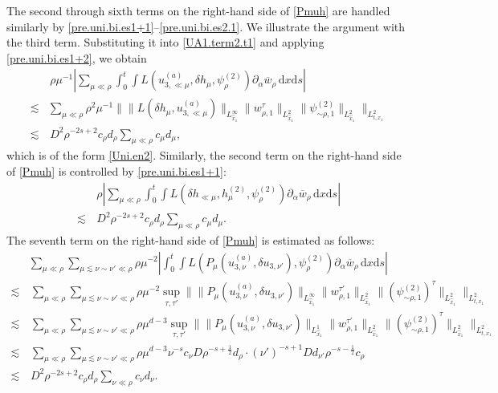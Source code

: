 \documentclass[11pt,letterpaper,reqno]{amsart}
\numberwithin{equation}{section}
\theoremstyle{definition}
\theoremstyle{remark}
\begin{document}
The second through sixth terms on the right-hand side of \eqref{Pmuh} are
handled similarly by \eqref{pre.uni.bi.es1+1}--\eqref{pre.uni.bi.es2.1}.
We illustrate the argument with the third term. Substituting it into
\eqref{UA1.term2.t1} and applying \eqref{pre.uni.bi.es1+2}, we obtain
\begin{align}
  &\,    \rho \mu^{-1} \left| \sum_{\mu \ll \rho}
\int_0^t\int
L
(u^{(a)}_{3, \ll\mu}, \delta h_{ \mu}, \psi_\rho^{(2)})
\partial_\alpha\overline{w}_\rho\,\mathrm{d} x \mathrm{d} s  
\right|  \label{Mrho.term2.1} \\
\lesssim &  \sum_{\mu\ll\rho}   
\rho^2\mu^{-1}  \big \| \|   L(  \delta h_{\mu},    u^{(a)}_{3, \ll \mu})\|_{L^\infty_{\widehat{x}_1}} \| w_{\rho,1}^{\tau}\|_{L^2_{\widehat{x}_1}} \|  \psi_{\sim\rho,1}^{(2)}\|_{L^2_{\widehat{x}_1}} \big\|_{L^2_{ t,x_1}} \nonumber\\
\lesssim &\,  D^2\rho^{-2s+2}
c_\rho d_\rho
\sum_{\mu\ll\rho}c_\mu d_\mu, \nonumber
\end{align}
which is of the form \eqref{Uni.en2}. Similarly, the second term on the right-hand side of \eqref{Pmuh} is
controlled by \eqref{pre.uni.bi.es1+1}:
\begin{align*}
  &\,    \rho  \left| \sum_{\mu \ll \rho}
\int_0^t\int
L
(\delta h_{\ll \mu}, h^{(2)}_{ \mu}, \psi_\rho^{(2)})
\partial_\alpha\overline{w}_\rho\,\mathrm{d} x \mathrm{d} s  
\right|  \\
\lesssim &\,  D^2\rho^{-2s+2}
c_\rho d_\rho
\sum_{\mu\ll\rho}c_\mu d_\mu.
\end{align*}
The seventh term on the right-hand side of \eqref{Pmuh} is estimated as
follows: 
\begin{align*}
     &\sum_{\mu\ll\rho}   \sum_{\mu \lesssim\nu\sim\nu'\ll \rho}   \rho \mu^{-2}\left|  
\int_0^t\int
L
(P_\mu(
  u_{3,\nu}^{(a)},  \delta u_{3, \nu'}), \psi_\rho^{(2)})
\partial_\alpha\overline{w}_\rho\,\mathrm{d} x \mathrm{d} s 
\right|   \\
\lesssim &\,  \sum_{\mu\ll\rho}   \sum_{\mu \lesssim\nu\sim\nu'\ll \rho}   \rho \mu^{-2} \sup_{\tau,\tau'} \big \| \|   P_\mu(
  u_{3,\nu}^{(a)},  \delta u_{3, \nu'})\|_{L^\infty_{\widehat{x}_1}} \| w_{\rho,1}^{\tau'}\|_{L^2_{\widehat{x}_1}} \|  (\psi_{\sim\rho,1}^{(2)})^{\tau} \|_{L^2_{\widehat{x}_1}} \big\|_{L^2_{ t,x_1}}\\
  \lesssim &\,  \sum_{\mu\ll\rho}   \sum_{\mu \lesssim\nu\sim\nu'\ll \rho}   \rho \mu^{d-3} \sup_{\tau,\tau'} \big \| \|   P_\mu(
  u_{3,\nu}^{(a)},  \delta u_{3, \nu'})\|_{L^1_{\widehat{x}_1}} \| w_{\rho,1}^{\tau'}\|_{L^2_{\widehat{x}_1}} \|  (\psi_{\sim\rho,1}^{(2)})^{\tau} \|_{L^2_{\widehat{x}_1}} \big\|_{L^2_{ t,x_1}}\\
  \lesssim  &\,  \sum_{\mu\ll\rho}   \sum_{\mu \lesssim\nu\sim\nu'\ll \rho}   \rho \mu^{d-3} \nu^{-s} c_\nu D \rho^{-s+\frac 12} d_\rho \cdot (\nu')^{-s+1} D d_{\nu'} \rho^{-s-\frac 12} c_\rho \\
\lesssim &\,  D^2\rho^{-2s+2}
c_\rho d_\rho
\sum_{\nu\ll\rho}c_\nu d_\nu.
\end{align*}
\end{document}
